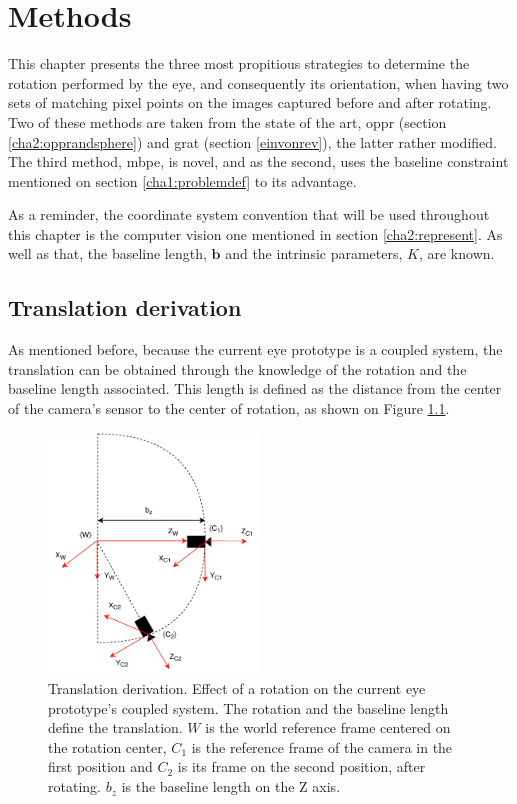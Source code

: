 
\chapter{Methods}
\label{methodology}

This chapter presents the three most propitious strategies to determine the rotation performed by the eye, and consequently its orientation, when having two sets of matching pixel points on the images captured before and after rotating. Two of these methods are taken from the state of the art, \acrlong{oppr} (section \ref{cha2:opprandsphere}) and \acrlong{grat} (section \ref{einvonrev}), the latter rather modified. The third method, \acrfull{mbpe}, is novel, and as the second, uses the baseline constraint mentioned on section \ref{cha1:problemdef} to its advantage.

As a reminder, the coordinate system convention that will be used throughout this chapter is the computer vision one mentioned in section \ref{cha2:represent}. As well as that, the baseline length, $\mathbf{b}$ and the intrinsic parameters, $K$, are known.

\section{Translation derivation}

As mentioned before, because the current eye prototype is a coupled system, the translation can be obtained through the knowledge of the rotation and the baseline length associated. This length is defined as the distance from the center of the camera's sensor to the center of rotation, as shown on Figure \ref{cha3:detori:translation}.
\begin{figure}[ht]
	\centering
	\includegraphics[width=0.5\textwidth]{images/transf.pdf}
	\caption[Translation derivation]{Translation derivation. Effect of a rotation on the current eye prototype's coupled system. The rotation and the baseline length define the translation. ${W}$ is the world reference frame centered on the rotation center, ${C_1}$ is the reference frame of the camera in the first position and ${C_2}$ is its frame on the second position, after rotating. $b_z$ is the baseline length on the Z axis.}
	\label{cha3:detori:translation}
\end{figure}


